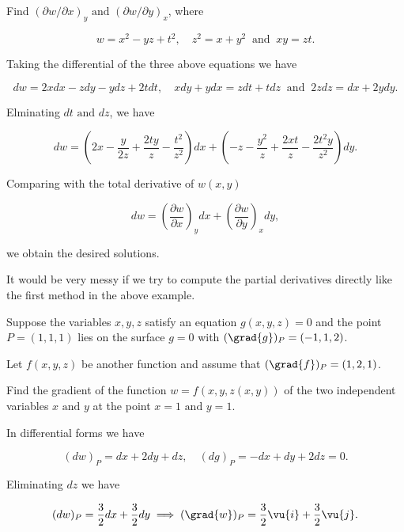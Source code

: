 \documentclass[english,a4paper,12pt]{report}
\begin{document}
{Find \((\partial w /\partial x)_{y} \text { and } (\partial w /\partial y)_{x} \), where

\begin{equation}
	w = x^2-yz+t^2, \quad z^2=x+y^2 ~\text { and }~ xy = zt.
\end{equation}
}
{Taking the differential of the three above equations we have

\begin{equation}
	dw = 2xdx - zdy - ydz + 2tdt, \quad x dy + ydx = zdt + tdz ~\text { and }~ 2zdz = dx + 2ydy.
\end{equation}

Elminating \(dt \text { and } dz\), we have

\begin{equation}
	dw = \left( 2x - \frac{y}{2z} + \frac{2ty}{z} - \frac{t^2}{z^2}    \right) dx + \left( -z - \frac{y^2}{z} + \frac{2xt}{z} - \frac{2t^2y}{z^2}    \right) dy.
\end{equation}

Comparing with the total derivative of \(w(x,y)\) 

\begin{equation}
	dw = \left( \frac{\partial w}{\partial x}  \right)_{y} dx + \left( \frac{\partial w}{\partial y}  \right)_{x} dy, 
\end{equation}

we obtain the desired solutions.

It would be very messy if we try to compute the partial derivatives directly like the first method in the above example.

} 

{Suppose the variables \(x,y,z\) satisfy an equation \(g(x,y,z) = 0\) and the point \(P = (1,1,1)\) lies on the surface \(g=0\) with \((\grad{g} )_{P} = (-1,1,2) \).

Let \(f(x,y,z)\) be another function and assume that \((\grad{f} )_{P} = (1,2,1) \). 

Find the gradient of the function \(w = f(x,y,z(x,y))\) of the two independent variables \(x \text { and } y\) at the point \(x = 1 \text { and } y = 1\).     }
{In differential forms we have

\begin{equation}
	(d w)_{P} = dx+2dy+dz, \quad (dg)_{P} = -dx+dy+2dz = 0.  
\end{equation}

Eliminating \(dz\) we have 

\begin{equation}
	(dw)_{P}= \frac{3}{2}dx + \frac{3}{2}dy \implies (\grad{w} )_{P}= \frac{3}{2}\vu{i} + \frac{3}{2}\vu{j} .      
\end{equation}
} 
\end{document}
